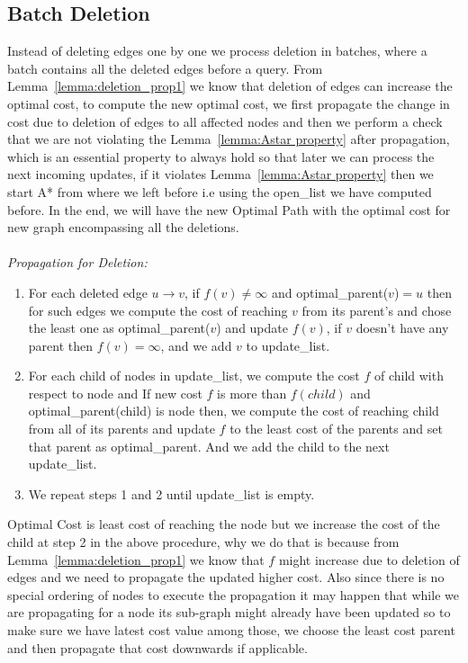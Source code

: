 \documentclass[a4paper]{article}
\begin{document}
\subsection{Batch Deletion}\label{subsec:batch_del}
Instead of deleting edges one by one we process deletion in batches, where a batch contains all the deleted edges before a query. From Lemma~\ref{lemma:deletion_prop1} we know that deletion of edges can increase the optimal cost, to compute the new optimal cost, we first propagate the change in cost due to deletion of edges to all affected nodes and then we perform a check that we are not violating the Lemma~\ref{lemma:Astar property} after propagation, which is an essential property to always hold so that later we can process the next incoming updates, if it violates Lemma~\ref{lemma:Astar property} then we start A* from where we left before i.e using the open\_list we have computed before. In the end, we will have the new Optimal Path with the optimal cost for new graph encompassing all the deletions.\\
\\
\textit{Propagation for Deletion:}
\begin{enumerate}
    \item For each deleted edge $u \rightarrow v$, if $f(v) \neq \infty$ and optimal\_parent($v$)$=u$ then for such edges we compute the cost of reaching $v$ from its parent's and chose the least one as optimal\_parent($v$) and update $f(v)$, if $v$ doesn't have any parent then $f(v)=\infty$, and we add $v$ to update\_list.
    
    \item For each child of nodes in update\_list, we compute the cost $f$ of child with respect to node and If new cost $f$ is more than $f(child)$ and optimal\_parent(child)  is node then, we compute the cost of reaching child from all of its parents and update $f$ to the least cost of the parents and set that parent as optimal\_parent. And we add the child to the next update\_list.
    
    \item We repeat steps 1 and 2 until update\_list is empty.
\end{enumerate}
Optimal Cost is least cost of reaching the node but we increase the cost of the child at step 2 in the above procedure, why we do that is because from Lemma~\ref{lemma:deletion_prop1} we know that $f$ might increase due to deletion of edges and we need to propagate the updated higher cost. Also since there is no special ordering of nodes to execute the propagation it may happen that while we are propagating for a node its sub-graph might already have been updated so to make sure we have latest cost value among those, we choose the least cost parent and then propagate that cost downwards if applicable.
\end{document}
